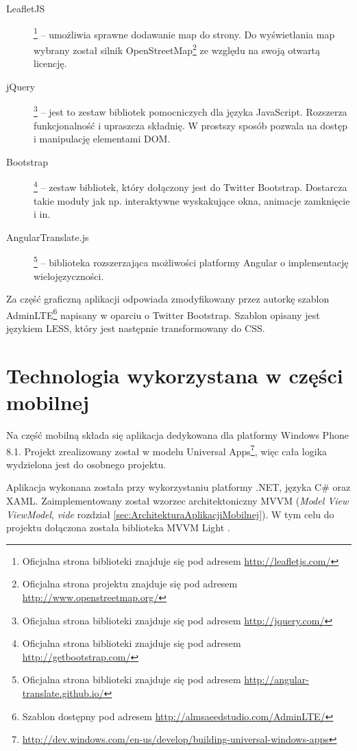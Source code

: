 \documentclass{book}
\begin{document}
		\begin{description}
			
			\item[LeafletJS]\footnote{Oficjalna strona biblioteki znajduje się pod adresem \url{http://leafletjs.com/}} -- 
			umożliwia sprawne dodawanie map do strony. Do wyświetlania map wybrany został silnik OpenStreetMap\footnote{Oficjalna strona projektu znajduje się pod adresem \url{http://www.openstreetmap.org/}} ze względu na swoją otwartą licencję.
			\item[jQuery]\footnote{Oficjalna strona biblioteki znajduje się pod adresem \url{http://jquery.com/}} -- 
			jest to zestaw bibliotek pomocniczych dla języka JavaScript. Rozszerza funkcjonalność i upraszcza składnię. W prostszy sposób pozwala na dostęp i manipulację elementami DOM.
			\item[Bootstrap]\footnote{Oficjalna strona biblioteki znajduje się pod adresem \url{http://getbootstrap.com/}} -- 
			zestaw bibliotek, który dołączony jest do Twitter Bootstrap. Dostarcza takie moduły jak np. interaktywne wyskakujące okna, animacje zamknięcie i in.
			\item[AngularTranslate.js]\footnote{Oficjalna strona biblioteki znajduje się pod adresem \url{http://angular-translate.github.io/}} -- 
			biblioteka rozszerzająca możliwości platformy Angular o implementację wielojęzyczności.  
		
		\end{description}
				
		Za część graficzną aplikacji odpowiada zmodyfikowany przez autorkę szablon AdminLTE\footnote{Szablon dostępny pod adresem \url{http://almsaeedstudio.com/AdminLTE/}} napisany w oparciu o Twitter Bootstrap. Szablon opisany jest językiem LESS, który jest następnie transformowany do CSS.
		
		\section{Technologia wykorzystana w części mobilnej}
	
		Na część mobilną składa się aplikacja dedykowana dla platformy Windows Phone 8.1. Projekt zrealizowany został w modelu Universal Apps\footnote{\url{http://dev.windows.com/en-us/develop/building-universal-windows-apps}}, więc cała logika wydzielona jest do osobnego projektu.
		
		Aplikacja wykonana została przy wykorzystaniu platformy .NET, języka C\# oraz XAML. Zaimplementowany został wzorzec architektoniczny MVVM (\emph{Model View ViewModel}, \emph{vide} rozdział \ref{sec:ArchitekturaAplikacjiMobilnej}). W tym celu do projektu dołączona została biblioteka MVVM Light \cite{id:MVVMLight}. 
		
\end{document}
